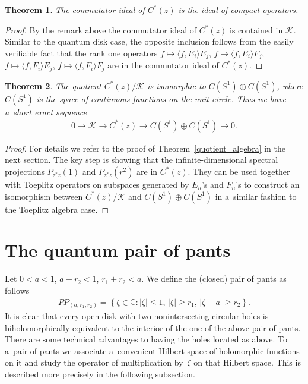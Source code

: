 \documentclass[pdftex]{sigma}
\numberwithin{equation}{section}
\newtheorem{Theorem}{Theorem}[section]
\begin{document}
\begin{Theorem}
The commutator ideal of $C^*(z)$ is the ideal of compact operators.
\end{Theorem}
\begin{proof}
By the remark above the commutator ideal of $C^*(z)$ is contained in $\mathcal{K}$.
Similar to the quantum disk case, the opposite inclusion follows from the easily verif\/iable fact that the rank one
operators $f\mapsto\langle f, E_i\rangle E_j$, $f\mapsto\langle f, E_i\rangle F_j$, $f\mapsto\langle f, F_i\rangle E_j$,
$f\mapsto\langle f, F_i\rangle F_j$ are in the commutator ideal of $C^*(z)$.
\end{proof}

\begin{Theorem}
The quotient $C^*(z)/\mathcal{K}$ is isomorphic to $C(S^1)\oplus C(S^1)$, where $C(S^1)$ is the space of continuous
functions on the unit circle.
Thus we have a~short exact sequence
\begin{gather*}
0\rightarrow \mathcal{K}\rightarrow C^*(z)\rightarrow C(S^1)\oplus C(S^1)\rightarrow 0.
\end{gather*}
\end{Theorem}

\begin{proof}
For details we refer to the proof of Theorem~\ref{quotient_algebra} in the next section.
The key step is showing that the inf\/inite-dimensional spectral projections $P_{z^*z}(1)$ and $P_{z^*z}(r^2)$ are in
$C^*(z)$.
They can be used together with Toeplitz operators on subspaces generated by $E_n$'s and $F_n$'s to construct an
isomorphism between $C^*(z)/\mathcal{K}$ and $C(S^1)\oplus C(S^1)$ in a~similar fashion to the Toeplitz algebra case.
\end{proof}

\section{The quantum pair of pants}\label{section3}

Let $0<a<1$, $a+r_2<1$, $r_1+r_2<a$.
We def\/ine the (closed) pair of pants as follows
\begin{gather*}
PP_{(a, r_1,r_2)}= \left\{\zeta\in{\mathbb C}: |\zeta| \leq 1,\, |\zeta|\geq r_1,\, |\zeta-a|\geq r_2\right\}.
\end{gather*}
It is clear that every open disk with two nonintersecting circular holes is biholomorphically equivalent to the interior
of the one of the above pair of pants.
There are some technical advantages to having the holes located as above.
To a~pair of pants we associate a~convenient Hilbert space of holomorphic functions on it and study the operator of
multiplication by~$\zeta$ on that Hilbert space.
This is described more precisely in the following subsection.
\end{document}

